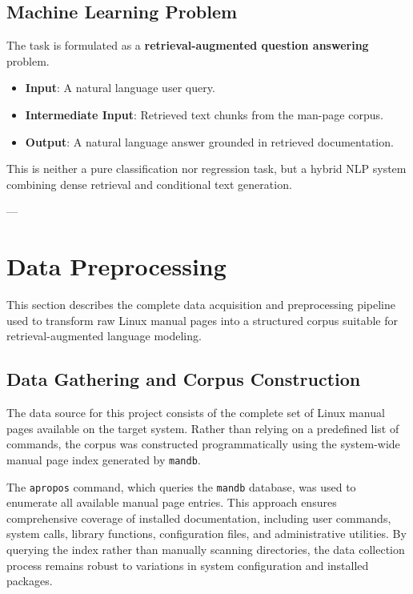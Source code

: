 \documentclass[conference]{IEEEtran}
\begin{document}
\subsection{Machine Learning Problem}

The task is formulated as a \textbf{retrieval-augmented question answering} problem.

\begin{itemize}
    \item \textbf{Input}: A natural language user query.
    \item \textbf{Intermediate Input}: Retrieved text chunks from the man-page corpus.
    \item \textbf{Output}: A natural language answer grounded in retrieved documentation.
\end{itemize}

This is neither a pure classification nor regression task, but a hybrid NLP system combining dense retrieval and conditional text generation.

---

\section{Data Preprocessing}

This section describes the complete data acquisition and preprocessing pipeline used to transform raw Linux manual pages into a structured corpus suitable for retrieval-augmented language modeling.

\subsection{Data Gathering and Corpus Construction}

The data source for this project consists of the complete set of Linux manual pages available on the target system. Rather than relying on a predefined list of commands, the corpus was constructed programmatically using the system-wide manual page index generated by \texttt{mandb}.

The \texttt{apropos} command, which queries the \texttt{mandb} database, was used to enumerate all available manual page entries. This approach ensures comprehensive coverage of installed documentation, including user commands, system calls, library functions, configuration files, and administrative utilities. By querying the index rather than manually scanning directories, the data collection process remains robust to variations in system configuration and installed packages.
\end{document}
